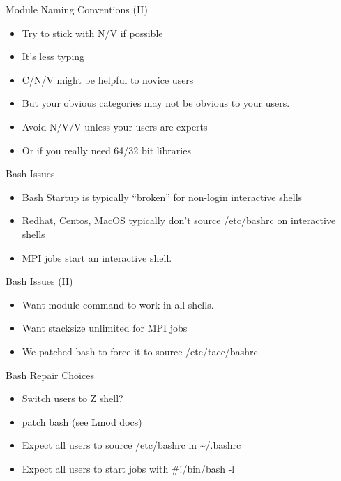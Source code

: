 \documentclass[dvipsnames,aspectratio=169]{beamer}
\begin{document}
\begin{frame}{Module Naming Conventions (II)}
  \begin{itemize}
    \item Try to stick with N/V if possible
    \item It's less typing
    \item C/N/V might be helpful to novice users
    \item But your obvious categories may not be obvious to your users.
    \item Avoid N/V/V unless your users are experts 
    \item Or if you really need 64/32 bit libraries
  \end{itemize}
\end{frame}

\begin{frame}{Bash Issues}
  \begin{itemize}
    \item Bash Startup is typically ``broken'' for non-login
      interactive shells
    \item Redhat, Centos, MacOS typically don't source /etc/bashrc on
      interactive shells
    \item MPI jobs start an interactive shell.
  \end{itemize}
\end{frame}

\begin{frame}{Bash Issues (II)}
  \begin{itemize}
    \item Want module command to work in all shells.
    \item Want stacksize unlimited for MPI jobs
    \item We patched bash to force it to source /etc/tacc/bashrc
  \end{itemize}
\end{frame}

\begin{frame}{Bash Repair Choices}
  \begin{itemize}
    \item Switch users to Z shell?
    \item patch bash (see Lmod docs)
    \item Expect all users to source /etc/bashrc in \textasciitilde/.bashrc
    \item Expect all users to start jobs with \#!/bin/bash -l
  \end{itemize}
\end{frame}
\end{document}
